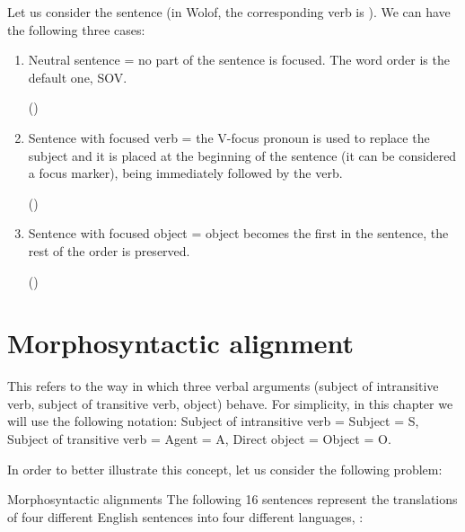 \begin{refsection}
 Let us consider the sentence  (in Wolof, the corresponding verb is ). We can have the following three cases:

\begin{enumerate}
    \item Neutral sentence = no part of the sentence is focused. The word order is the default one, SOV.

    \centerline{ ()}
    \item Sentence with focused verb = the V-focus pronoun is used to replace the subject and it is placed at the beginning of the sentence (it can be considered a focus marker), being immediately followed by the verb.

    \centerline{ ()}
    \item Sentence with focused object = object becomes the first in the sentence, the rest of the order is preserved.

    \centerline{ ()}
\end{enumerate}

\section{Morphosyntactic alignment} \label{morphoalign}

 This refers to the way in which three verbal arguments (subject of intransitive verb, subject of transitive verb, object) behave. For simplicity, in this chapter we will use the following notation: Subject of intransitive verb = Subject = S, Subject of transitive verb = Agent = A, Direct object = Object = O.

In order to better illustrate this concept, let us consider the following problem:

\begin{problem}{Morphosyntactic alignments}{\nameVNeacsu}{}
The following 16 sentences represent the translations of four different English sentences into four different languages, \OlympiadRandomOrder{}:


\end{problem}
\end{refsection}
